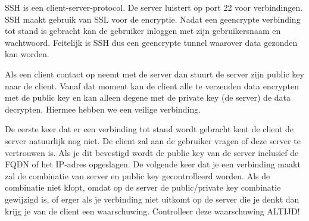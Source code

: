 SSH is een client-server-protocol. De server luistert op port 22 voor verbindingen. SSH maakt gebruik van SSL voor de encryptie. Nadat een geencrypte verbinding tot stand is gebracht kan de gebruiker inloggen met zijn gebruikersnaam en wachtwoord. Feitelijk is SSH dus een geencrypte tunnel waarover data gezonden kan worden.

Als een client contact op neemt met de server dan stuurt de server zijn public key naar de client. Vanaf dat moment kan de client alle te verzenden data encrypten met de public key en kan alleen degene met de private key (de server) de data decrypten. Hiermee hebben we een veilige verbinding.

De eerste keer dat er een verbinding tot stand wordt gebracht kent de client de server natuurlijk nog niet. De client zal aan de gebruiker vragen of deze server te vertrouwen is. Als je dit bevestigd wordt de public key van de server inclusief de FQDN of het IP-adres opgeslagen. De volgende keer dat je een verbinding maakt zal de combinatie van server en public key gecontrolleerd worden. Als de combinatie niet klopt, omdat op de server de public/private key combinatie gewijzigd is, of erger als je verbinding niet uitkomt op de server die je denkt dan krijg je van de client een waarschuwing. Controlleer deze waarschuwing ALTIJD!

